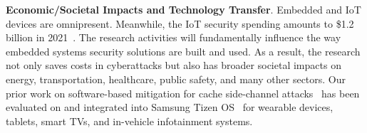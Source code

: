 \textbf{Economic/Societal Impacts and Technology Transfer}. 
Embedded and IoT devices are omnipresent.
Meanwhile, %
the IoT security spending amounts to \$1.2 billion in 2021~\cite{Statista}.
The research activities will fundamentally influence the way embedded systems security solutions are built and used.
As a result, the research not only saves costs in cyberattacks but also has broader societal impacts on energy, transportation, healthcare, public safety, and many other sectors. 
Our prior work on software-based mitigation for cache side-channel attacks~\cite{cho2020smokebomb} has been evaluated on and integrated into Samsung Tizen OS~\cite{Tizen} for wearable devices, tablets, smart TVs, and in-vehicle infotainment systems.

